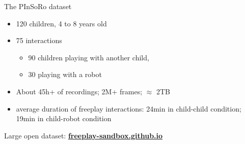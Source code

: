 \documentclass[compress]{beamer}
\begin{document}

\begin{frame}{The PInSoRo dataset}
    \begin{itemize}
        \item 120 children, 4 to 8 years old
        \item 75 interactions
            \begin{itemize}
                \item 90 children playing with another child, 
                \item 30 playing with a robot
            \end{itemize}
        \item About 45h+ of recordings; 2M+ frames; $\approx$ 2TB
         \item average duration of freeplay interactions: 24min in child-child
         condition; 19min in child-robot condition
    \end{itemize}

    \begin{center}
        Large open dataset: \href{https://freeplay-sandbox.github.io}{\bf freeplay-sandbox.github.io}
    \end{center}
\end{frame}
%
%
%

\end{document}
